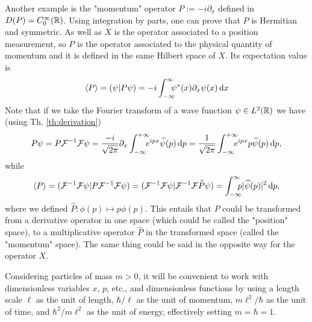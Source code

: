  \begin{example}
 	Another example is the "momentum" operator $P:=-i\partial_x$ defined in $D(P)=C_0^\infty({\mathbb R})$. Using integration by parts, one can prove that $P$ is Hermitian and symmetric. As well as $X$ is the operator associated to a position measurement, so $P$ is the operator associated to the physical quantity of momentum and it is defined in the same Hilbert space of $X$. Its expectation value is
 	\begin{equation}
 		\braket{P}=(\psi|P\psi)=-i\int_{-\infty}^{\infty}\!\!\!\!\psi^*(x)\partial_x\psi(x)\, \mathrm d x
 	\end{equation} 
 	Note that if we take the Fourier transform of a wave function $\psi\in L^2({\mathbb R})$ we have (using Th. \ref{th:derivation})
 	\begin{equation}
 		P\psi=P\mathcal{F}^{-1}\mathcal{F}\psi=\frac{-i}{\sqrt{2\pi}}\partial_x\int_{-\infty}^{+\infty}\nspace\! e^{ipx}\hat{\psi}(p)\, \dd p=\frac{1}{\sqrt{2\pi}}\int_{-\infty}^{+\infty}\nspace\!e^{ipx}p\hat{\psi}(p)\, \dd p,
 	\end{equation}
 	while
 	\begin{equation}
 		\braket{P}=(\mathcal{F}^{-1}\mathcal{F}\psi|P\mathcal{F}^{-1}\mathcal{F}\psi)=(\mathcal{F}^{-1}\mathcal{F}\psi|\mathcal{F}^{-1}\mathcal{F}\widehat{P}\psi)=\int_{-\infty}^{\infty}\!\!\!\!p|\widehat{\psi}(p)|^2\, \mathrm d p,
 	\end{equation}
 	where we defined $\hat{P}:\phi(p)\mapsto p\phi(p)$. This entails that $P$ could be transformed from a derivative operator in one space (which could be called the "position" space), to a multiplicative operator $\hat{P}$ in the transformed space (called the "momentum" space). The same thing could be said in the opposite way for the operator $X$.
 \end{example}
 \begin{rem}
 	Considering particles of mass $m>0$, it will be convenient to work with dimensionless variables $x$, $p$, etc., and dimensionless functions by using a length scale $\ell$ as the unit of length, $\hbar/\ell$ as the unit of momentum, $m\ell^2/\hbar$ as the unit of time, and $\hbar^2/m\ell^2$ as the unit of energy, effectively setting $m=\hbar=1$.
 \end{rem}
 
